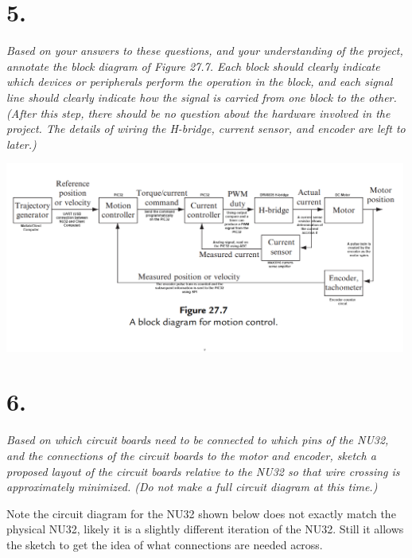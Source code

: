 \documentclass[12pt]{article}
\begin{document}
\section*{5.}
\textit{Based on your answers to these questions, and your understanding of the project, annotate the block diagram of Figure 27.7. Each block should clearly indicate which devices or peripherals perform the operation in the block, and each signal line should clearly indicate how the signal is carried from one block to the other. (After this step, there should be no question about the hardware involved in the project. The details of wiring the H-bridge, current sensor, and encoder are left to later.)}

\begin{center}
    \includegraphics[width=5.2in]{fig27_7_labelled.png}
\end{center}

\section*{6.}
\textit{Based on which circuit boards need to be connected to which pins of the NU32, and the connections of the circuit boards to the motor and encoder, sketch a proposed layout of the circuit boards relative to the NU32 so that wire crossing is approximately minimized. (Do not make a full circuit diagram at this time.)}

Note the circuit diagram for the NU32 shown below does not exactly match the physical NU32, likely it is a slightly different iteration of the NU32. 
Still it allows the sketch to get the idea of what connections are needed across.
\end{document}
